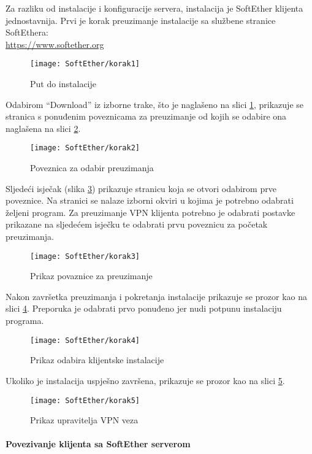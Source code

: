 \hfill \smallbreak
Za razliku od instalacije i konfiguracije servera, instalacija je SoftEther klijenta jednostavnija. Prvi je korak preuzimanje instalacije sa službene stranice SoftEthera:\\ \url{https://www.softether.org}
\begin{figure}[h!]
	\centering
     \texttt{[image: SoftEther/korak1]}
     	\caption{Put do instalacije}
     	\label{fig:link4-soft}
\end{figure}
\FloatBarrier
Odabirom ``Download'' iz izborne trake, što je naglašeno na slici \ref{fig:link4-soft},  prikazuje se stranica s ponuđenim poveznicama za preuzimanje od kojih se odabire ona naglašena na slici \ref{fig:link5-soft}.
\begin{figure}[h!]
     \centering
     \texttt{[image: SoftEther/korak2]}
     \caption{Poveznica za odabir preuzimanja}
     \label{fig:link5-soft}
\end{figure}
\FloatBarrier
Sljedeći isječak (slika \ref{fig:link6-soft}) prikazuje stranicu koja se otvori odabirom prve poveznice. Na stranici se nalaze izborni okviri u kojima je potrebno odabrati željeni program. Za preuzimanje VPN klijenta potrebno je odabrati postavke prikazane na sljedećem isječku te odabrati prvu poveznicu za početak preuzimanja.
\begin{figure}[h!]
     \centering
     \texttt{[image: SoftEther/korak3]}
     \caption{Prikaz povaznice za preuzimanje}
     \label{fig:link6-soft}
\end{figure}
\FloatBarrier
Nakon završetka preuzimanja i pokretanja instalacije prikazuje se prozor kao na slici \ref{fig:odabir2-soft}. Preporuka je odabrati prvo ponuđeno jer nudi potpunu instalaciju programa.
\begin{figure}[h!]
     \centering
     \texttt{[image: SoftEther/korak4]}
     \caption{Prikaz odabira klijentske instalacije}
     \label{fig:odabir2-soft}
\end{figure}
\FloatBarrier
Ukoliko je instalacija uspješno završena, prikazuje se prozor kao na slici \ref{fig:upravitelj-soft}.
\begin{figure}[h!]
     \centering
     \texttt{[image: SoftEther/korak5]}
     \caption{Prikaz upravitelja VPN veza}
     \label{fig:upravitelj-soft}
\end{figure}
\FloatBarrier
\newpage
\paragraph*{Povezivanje klijenta sa SoftEther serverom}

